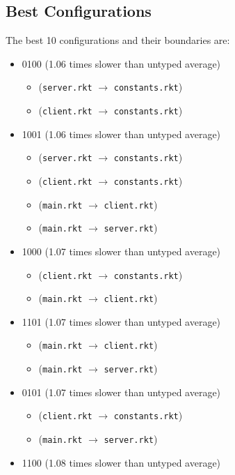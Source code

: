 \documentclass{article}
\newcommand{\mono}[1]{\texttt{#1}}
\begin{document}
\subsection{Best Configurations}
The best 10 configurations and their boundaries are:
\begin{itemize}
\item 0100 (1.06 times slower than untyped average)
  \begin{itemize}
  \item (\mono{server.rkt} $\rightarrow$ \mono{constants.rkt})
  \item (\mono{client.rkt} $\rightarrow$ \mono{constants.rkt})
  \end{itemize}
\item 1001 (1.06 times slower than untyped average)
  \begin{itemize}
  \item (\mono{server.rkt} $\rightarrow$ \mono{constants.rkt})
  \item (\mono{client.rkt} $\rightarrow$ \mono{constants.rkt})
  \item (\mono{main.rkt} $\rightarrow$ \mono{client.rkt})
  \item (\mono{main.rkt} $\rightarrow$ \mono{server.rkt})
  \end{itemize}
\item 1000 (1.07 times slower than untyped average)
  \begin{itemize}
  \item (\mono{client.rkt} $\rightarrow$ \mono{constants.rkt})
  \item (\mono{main.rkt} $\rightarrow$ \mono{client.rkt})
  \end{itemize}
\item 1101 (1.07 times slower than untyped average)
  \begin{itemize}
  \item (\mono{main.rkt} $\rightarrow$ \mono{client.rkt})
  \item (\mono{main.rkt} $\rightarrow$ \mono{server.rkt})
  \end{itemize}
\item 0101 (1.07 times slower than untyped average)
  \begin{itemize}
  \item (\mono{client.rkt} $\rightarrow$ \mono{constants.rkt})
  \item (\mono{main.rkt} $\rightarrow$ \mono{server.rkt})
  \end{itemize}
\item 1100 (1.08 times slower than untyped average)

\end{itemize}
\end{document}
